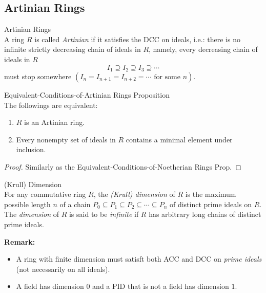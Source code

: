 \subsection{Artinian Rings}

\begin{definition}{Artinian Rings}\\
A ring $R$ is called \textit{Artinian} if it satisfies the DCC on ideals, i.e.: there is no infinite strictly decreasing chain of ideals in $R$, namely, every decreasing chain of ideals in $R$
$$I_1 \supseteq I_2 \supseteq I_3 \supseteq \cdots$$
must stop somewhere $(I_n = I_{n+1} =I_{n+2} =\cdots \text{ for some }n)$.
\end{definition}

\begin{proposition}{Equivalent-Conditions-of-Artinian Rings Proposition}\\
The followings are equivalent:
\begin{enumerate}
    \item $R$ is an Artinian ring.
    \item Every nonempty set of ideals in $R$ contains a minimal element under inclusion.
\end{enumerate}
\end{proposition}

\begin{proof}
    Similarly as the Equivalent-Conditions-of-Noetherian Rings Prop.
\end{proof}

\begin{definition}{(Krull) Dimension}\\
For any commutative ring $R$, the \textit{(Krull) dimension} of $R$ is the maximum possible length $n$ of a chain $P_0 \subseteq P_1 \subseteq P_2 \subseteq \cdots \subseteq P_n$ of distinct prime ideals on $R$. The \textit{dimension} of $R$ is said to be \textit{infinite} if $R$ has arbitrary long chains of distinct prime ideals.
\end{definition}

\noindent\textbf{Remark:} \begin{itemize}
    \item A ring with finite dimension must satisft both ACC and DCC on \textit{prime ideals} (not necessarily on all ideals).
    \item A field has dimension $0$ and a PID that is not a field has dimension $1$.
\end{itemize}

